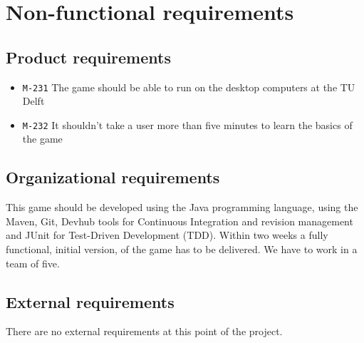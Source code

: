 \documentclass[a4paper]{article}
\begin{document}
\clearpage


\section{Non-functional requirements}
\subsection{Product requirements}

\begin{itemize}
  \item \texttt{M-231} The game should be able to run on the desktop computers at the TU Delft
  \item \texttt{M-232} It shouldn't take a user more than five minutes to learn the basics of the game
\end{itemize}


\subsection{Organizational requirements}
This game should be developed using the Java programming language, using the Maven, Git, Devhub tools for Continuous Integration and revision management and JUnit for Test-Driven Development (TDD). Within two weeks a fully functional, initial version, of the game has to be delivered. We have to work in a team of five.

\subsection{External requirements}
There are no external requirements at this point of the project.





\pagebreak
\end{document}
